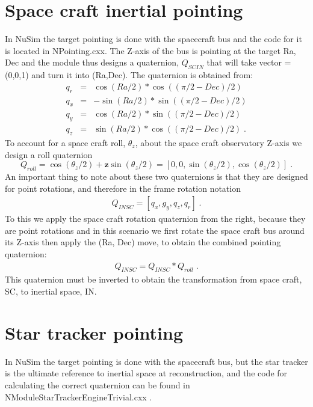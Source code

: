 \section{Space craft inertial pointing}
In NuSim the target pointing is done with the spacecraft bus and the code for it is located in NPointing.cxx. The Z-axis of the bus is pointing at the target Ra, Dec and the module thus designs a quaternion, $Q_{SCIN}$ that will take vector = (0,0,1) and turn it into (Ra,Dec). The quaternion is obtained from:
\begin{eqnarray}
q_r &=& \cos(Ra/2)*\cos((\pi/2-Dec)/2) \\
q_x &=& -\sin(Ra/2)*\sin((\pi/2-Dec)/2) \\
q_y &=& \cos(Ra/2)*\sin((\pi/2-Dec)/2) \\
q_z &=& \sin(Ra/2)*\cos((\pi/2-Dec)/2) \;.
\end{eqnarray}
To account for a space craft roll, $\theta_z$, about the space craft observatory Z-axis we design a roll quaternion
\begin{equation}
Q_{roll} = \cos(\theta_z/2)+\mathbf{z}\sin(\theta_z/2)=[0,0,\sin(\theta_z/2),\cos(\theta_z/2)] \;.
\end{equation}
An important thing to note about these two quaternions is that they are designed for point rotations, and therefore in the frame rotation notation
\begin{eqnarray}
Q_{INSC} = [q_x,g_y,q_z,q_r] \;.
\end{eqnarray}
To this we apply the space craft rotation quaternion from the right, because they are point rotations and in this scenario we first rotate the space craft bus around its Z-axis then apply the (Ra, Dec) move, to obtain the combined pointing quaternion:
\begin{eqnarray}
Q_{INSC} = Q_{INSC} * Q_{roll}\;.
\end{eqnarray}
This quaternion must be inverted to obtain the transformation from space craft, SC, to inertial space, IN.

\section{Star tracker pointing}
In NuSim the target pointing is done with the spacecraft bus, but the star tracker is the ultimate reference to inertial space at reconstruction, and the code for calculating the correct quaternion can be found in NModuleStarTrackerEngineTrivial.cxx . 

